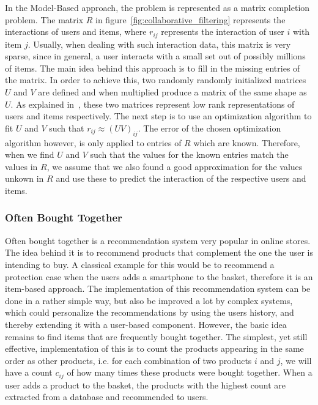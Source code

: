 In the Model-Based approach, the problem is represented as a matrix completion problem.
The matrix $R$ in figure~\ref{fig:collaborative_filtering} represents the interactions of users and items, where $r_{ij}$ represents the interaction of user $i$ with item $j$.
Usually, when dealing with such interaction data, this matrix is very sparse, since in general, a user interacts with a small set out of possibly millions of items.
The main idea behind this approach is to fill in the missing entries of the matrix.
In order to achieve this, two randomly randomly initialized matrices $U$ and $V$ are defined and when multiplied produce a matrix of the same shape as $U$.
As explained in~\cite{collaborative_filtering}, these two matrices represent low rank representations of users and items respectively.
The next step is to use an optimization algorithm to fit $U$ and $V$ such that $r_{ij} \approx (UV)_{ij}$.
The error of the chosen optimization algorithm however, is only applied to entries of $R$ which are known.
Therefore, when we find $U$ and $V$ such that the values for the known entries match the values in $R$, we assume that we also found a good approximation for the values unkown in $R$ and use these to predict the interaction of the respective users and items.

\subsubsection{Often Bought Together}\label{sec:often_bought_together}
Often bought together is a recommendation system very popular in online stores.
The idea behind it is to recommend products that complement the one the user is intending to buy.
A classical example for this would be to recommend a protection case when the users adds a smartphone to the basket, therefore it is an item-based approach.
The implementation of this recommendation system can be done in a rather simple way, but also be improved a lot by complex systems, which could personalize the recommendations by using the users history, and thereby extending it with a user-based component.
However, the basic idea remains to find items that are frequently bought together.
The simplest, yet still effective, implementation of this is to count the products appearing in the same order as other products, i.e. for each combination of two products $i$ and $j$, we will have a count $c_{ij}$ of how many times these products were bought together.
When a user adds a product to the basket, the products with the highest count are extracted from a database and recommended to users.

